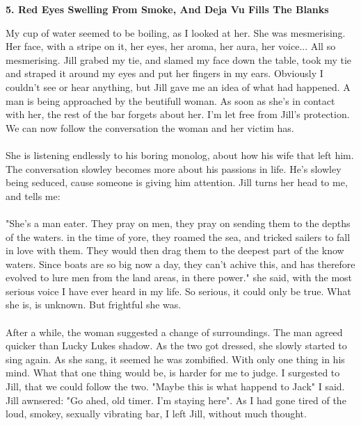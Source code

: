 \documentclass[]{article}
\begin{document}
\newpage 

\begin{center}
\large\textbf{5. Red Eyes Swelling From Smoke, \newline And Deja Vu Fills The Blanks}
\end{center}

My cup of water seemed to be boiling, as I looked at her. She was mesmerising. Her face, with a stripe on it, her eyes, her aroma, her aura, her voice... All so mesmerising. Jill grabed my tie, and slamed my face down the table, took my tie and straped it around my eyes and put her fingers in my ears. Obviously I couldn't see or hear anything, but Jill gave me an idea of what had happened. A man is being approached by the beutifull woman. As soon as she's in contact with her, the rest of the bar forgets about her. I'm let free from Jill's protection. We can now follow the conversation the woman and her victim has.
\\ \\
She is listening endlessly to his boring monolog, about how his wife that left him. The conversation slowley becomes more about his passions in life. He's slowley being seduced, cause someone is giving him attention. Jill turns her head to me, and tells me:
\\ \\
"She's a man eater. They pray on men, they pray on sending them to the depths of the waters. in the time of yore, they roamed the sea, and tricked sailers to fall in love with them. They would then drag them to the deepest part of the know waters. Since boats are so big now a day, they can't achive this, and has therefore evolved to lure men from the land areas, in there power." she said, with the most serious voice I have ever heard in my life. So serious, it could only be true. What she is, is unknown. But frightful she was. 
\\ \\
After a while, the woman suggested a change of surroundings. The man agreed quicker than Lucky Lukes shadow. As the two got dressed, she slowly started to sing again. As she sang, it seemed he was zombified. With only one thing in his mind. What that one thing would be, is harder for me to judge. I surgested to Jill, that we could follow the two. "Maybe this is what happend to Jack" I said. Jill awnsered: "Go ahed, old timer. I'm staying here". As I had gone tired of the loud, smokey, sexually vibrating bar, I left Jill, without much thought. 
\\ \\
\end{document}
